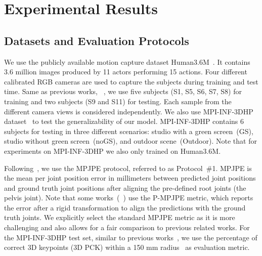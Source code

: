 \documentclass[runningheads]{llncs}
\begin{document}
\section{Experimental Results}
\subsection{Datasets and Evaluation Protocols}
We use the publicly available motion capture dataset Human3.6M~\cite{h36m_pami}. It contains 3.6 million images produced by 11 actors performing 15 actions. Four different calibrated RGB cameras are used to capture the subjects during training and test time. Same as previous works, \eg~\cite{martinez2017simple, Tekin_2017_ICCV, sun2017compositional, pavlakos2018ordinal, zhaoCVPR19semantic, sharma2019monocular, xu2021graph}, we use five subjects (S1, S5, S6, S7, S8) for training and two subjects (S9 and S11) for testing. Each sample from the  different camera views is considered independently. We also use MPI-INF-3DHP dataset~\cite{mono-3dhp2017} to test the generalizability of our model. MPI-INF-3DHP contains 6 subjects for testing in three different scenarios: studio with a green screen~(GS), studio without green screen~(noGS), and outdoor scene~(Outdoor). Note that for experiments on MPI-INF-3DHP we also only trained on Human3.6M.

Following~\cite{martinez2017simple, Tekin_2017_ICCV, sun2017compositional, zhaoCVPR19semantic, xu2021graph}, we use the MPJPE protocol, referred to as Protocol~\#1. MPJPE is the mean per joint position error in millimeters between predicted joint positions and ground truth joint positions after aligning the pre-defined root joints (\ie the pelvis joint). Note that some works~(\eg~\cite{pavllo20193d, liu2020comprehensive}) use the P-MPJPE metric, which reports the error after a rigid transformation to align the predictions with the ground truth joints. We explicitly select the standard MPJPE metric as it is more challenging and also allows for a fair comparison to previous related works. For the MPI-INF-3DHP test set, similar to previous works~\cite{xu2021graph, luo2018}, we use the percentage of correct 3D keypoints (3D PCK) within a 150 mm radius~\cite{mono-3dhp2017} as evaluation metric.
\vspace{-10px}
\end{document}
